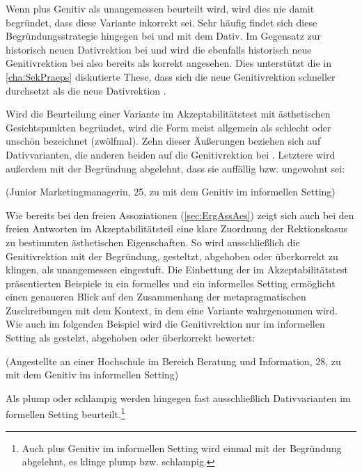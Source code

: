 Wenn \dank{} plus Genitiv als unangemessen beurteilt wird, wird dies nie damit begründet, dass diese Variante inkorrekt sei. 
Sehr häufig findet sich diese Begründungsstrategie hingegen bei \wegen{} und \waehrend{} mit dem Dativ. 
Im Gegensatz zur historisch neuen Dativrektion bei \wegen{} und \waehrend{} wird die ebenfalls historisch neue Genitivrektion bei \dank{} also bereits als korrekt angesehen. 
Dies unterstützt die in \autoref{cha:SekPraeps} diskutierte These, dass sich die neue Genitivrektion schneller durchsetzt als die neue Dativrektion \citep[s. auch][257]{Baumann2014}. 

Wird die Beurteilung einer Variante im Akzeptabilitätstest mit ästhetischen Gesichtspunkten begründet, wird die Form meist allgemein als schlecht oder unschön bezeichnet (zwölfmal).
Zehn dieser Äußerungen beziehen sich auf Dativvarianten, die anderen beiden auf die Genitivrektion bei \gegenueber. 
Letztere wird außerdem mit der Begründung abgelehnt, dass sie auffällig bzw. ungewohnt sei:
\begin{exe}
\ex {} (Junior Marketingmanagerin, 25, zu \gegenueber{} mit dem Genitiv im informellen Setting)
\end{exe} 
Wie bereits bei den freien Assoziationen (\autoref{sec:ErgAssAes}) zeigt sich auch bei den freien Antworten im Akzeptabilitätsteil eine klare Zuordnung der Rektionskasus zu bestimmten ästhetischen Eigenschaften. 
So wird ausschließlich die Genitivrektion mit der Begründung, gesteltzt, abgehoben oder überkorrekt zu klingen, als unangemessen eingestuft. 
Die Einbettung der im Akzeptabilitätstest präsentierten Beispiele in ein formelles und ein informelles Setting ermöglicht einen genaueren Blick auf den Zusammenhang der metapragmatischen Zuschreibungen mit dem Kontext, in dem eine Variante wahrgenommen wird. 
Wie auch im folgenden Beispiel wird die Genitivrektion nur im informellen Setting als gestelzt, abgehoben oder überkorrekt bewertet:
\begin{exe}
\ex {} (Angestellte an einer Hochschule im Bereich Beratung und Information, 28, zu \dank{} mit dem Genitiv im informellen Setting) \label{Bsp:BegrForm1}
\end{exe}
Als plump oder schlampig werden hingegen fast ausschließlich Dativvarianten im formellen Setting beurteilt.\footnote{Auch \gegenueber{} plus Genitiv im informellen Setting wird einmal mit der Begründung abgelehnt, es klinge plump bzw. schlampig. } 

